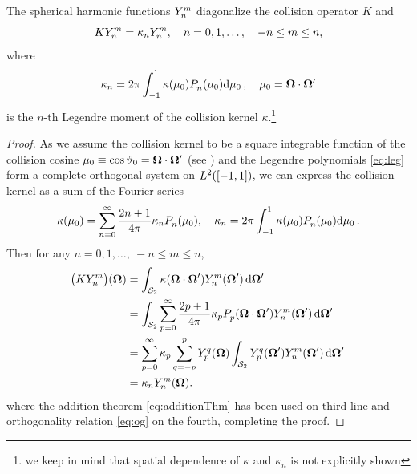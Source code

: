 \begin{lemma}\label{lem:appC}
The spherical harmonic functions $\Y{n}{m}$ diagonalize the collision operator $K$ and
$$
	K\Y{n}{m} = \kappa_n \Y{n}{m},\quad n = 0,1,\ldots,\quad -n \leq m \leq n,
$$
where
$$
	\kappa_n = 2\pi \muint[_0]{\kappa(\mu_0)\P{n}{}(\mu_0)},\quad \mu_0 = \bomega\cdot\bomega'
$$
is the $n$-th Legendre moment of the collision kernel $\kappa$.\footnote{we keep in mind that
spatial dependence of $\kappa$ and $\kappa_n$ is not explicitly shown}
\end{lemma}  
\begin{proof}
	As we assume the collision kernel to be a square integrable function of the collision cosine  
	$\mu_0 \equiv \cos \polar_0 = \bomega\cdot\bomega'$ (see )
	and the Legendre polynomials \eqref{eq:leg} form a complete orthogonal system on $\Lp[2]([-1,1])$, we can express the
	collision kernel as a sum of the Fourier series
	\begin{equation}\label{eq:scattering_exp}
		\kappa(\mu_0) = \suma[n]{0}{\infty}\frac{2n+1}{4\pi}\kappa_n\P{n}{}(\mu_0),\quad
		\kappa_n = 2\pi \muint[_0]{\kappa(\mu_0)\P{n}{}(\mu_0)}.
	\end{equation}
	Then for any $n = 0,1,\ldots,\ -n \leq m \leq n$,
	\begin{equation}\label{eq:scattering_PN}
\begin{aligned}
	\bigl(K\Y{n}{m}\bigr)(\bomega) &= \intA[']{\kappa(\bomega\cdot\bomega')\Y{n}{m}(\bomega')} \\
	&= \intA[']{\suma[p]{0}{\infty}\frac{2p+1}{4\pi}\kappa_p\P{p}{}(\bomega\cdot\bomega')\Y{n}{m}(\bomega')} \\
	&= \suma[p]{0}{\infty}\kappa_p\suma[q]{-p}{p}\Y{p}{q}(\bomega)\intA[']{\Y{p}{q}(\bomega')\Y{n}{m}(\bomega')} \\
	&= \kappa_n\Y{n}{m}(\bomega).
\end{aligned}
\end{equation}
	where the addition theorem \eqref{eq:additionThm} has been used on third line and orthogonality relation \eqref{eq:og}
	on the fourth, completing the proof.
\end{proof}

